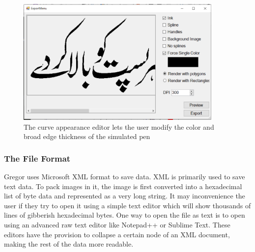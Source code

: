 {{        \begin{figure}
          \centering
          \includegraphics[width=0.9\textwidth]{../Images/ExportMenu.PNG}
          \caption{The curve appearance editor lets the user modify the color and broad edge thickness of the simulated pen} \label{Fig:ExportMenu}
        \end{figure}
    }
    \subsubsection{The File Format}
    {
        Gregor uses Microsoft XML format to save data. XML is primarily used to save text data. To pack images in it, the image is first converted into a hexadecimal list of byte data and represented as a very long string. It may inconvenience the user if they try to open it using a simple text editor which will show thousands of lines of gibberish hexadecimal bytes. One way to open the file as text is to open using an advanced raw text editor like Notepad++ or Sublime Text. These editors have the provision to collapse a certain node of an XML document, making the rest of the data more readable.
    }
}
\clearpage 